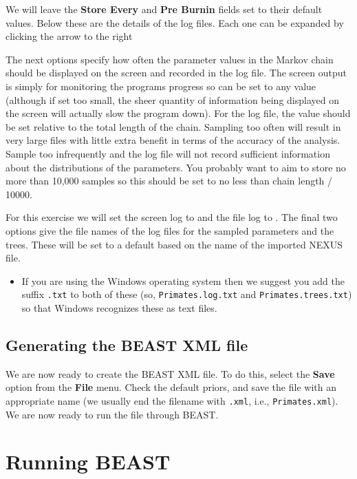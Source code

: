 \documentclass[11pt]{article}
\theoremstyle{plain}%
\theoremstyle{definition}
\theoremstyle{remark}
\begin{document}
We will leave the \textbf{Store Every}  and \textbf{Pre Burnin} fields set to their default values. Below these are the details of the log files. Each one can be expanded by clicking the arrow to the right

The next options specify how often the parameter values in the Markov
chain should be displayed on the screen and recorded in the log file.
The screen output is simply for monitoring the programs progress so
can be set to any value (although if set too small, the sheer quantity
of information being displayed on the screen will actually slow the
program down). For the log file, the value should be set relative
to the total length of the chain. Sampling too often will result in
very large files with little extra benefit in terms of the accuracy
of the analysis. Sample too infrequently and the log file will not
record sufficient information about the distributions of the parameters. 
You probably want to aim to store no more than 10,000 samples so this should be
set to no less than chain length / 10000.

For this exercise we will set the screen log to \screenEvery{} and the file log to \logEvery{}. The final two
options give the file names of the log files for the sampled parameters and
the trees. These will be set to a default based on the name of the
imported NEXUS file. 

\begin{itemize}
\item If you are using the Windows operating system then we suggest you add the suffix \texttt{.txt} to both of these (so,
\texttt{Primates.log.txt} and \texttt{Primates.trees.txt}) so that Windows recognizes
these as text files. 
\end{itemize}

\subsection{Generating the BEAST XML file }

We are now ready to create the BEAST XML file. To do this,
select the \textbf{Save} option from the \textbf{File} menu. 
Check the default priors, and save the file with an appropriate name
(we usually end the filename with \texttt{.xml}, i.e., \texttt{Primates.xml}).
We are now ready to run the file through BEAST. 

\section{Running BEAST }
\end{document}
